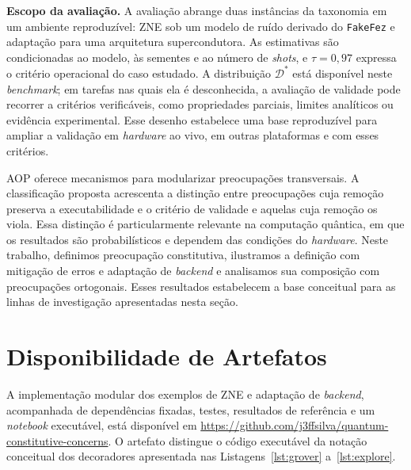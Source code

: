 \documentclass[sigconf]{acmart}
\begin{document}
\textbf{Escopo da avaliação.} A avaliação abrange duas instâncias da taxonomia em um ambiente reproduzível: ZNE sob um modelo de ruído derivado do \texttt{FakeFez} e adaptação para uma arquitetura supercondutora. As estimativas são condicionadas ao modelo, às sementes e ao número de \textit{shots}, e $\tau=0{,}97$ expressa o critério operacional do caso estudado. A distribuição $\mathcal{D}^*$ está disponível neste \textit{benchmark}; em tarefas nas quais ela é desconhecida, a avaliação de validade pode recorrer a critérios verificáveis, como propriedades parciais, limites analíticos ou evidência experimental. Esse desenho estabelece uma base reproduzível para ampliar a validação em \textit{hardware} ao vivo, em outras plataformas e com esses critérios.

AOP oferece mecanismos para modularizar preocupações transversais. A classificação proposta acrescenta a distinção entre preocupações cuja remoção preserva a executabilidade e o critério de validade e aquelas cuja remoção os viola. Essa distinção é particularmente relevante na computação quântica, em que os resultados são probabilísticos e dependem das condições do \textit{hardware}. Neste trabalho, definimos preocupação constitutiva, ilustramos a definição com mitigação de erros e adaptação de \textit{backend} e analisamos sua composição com preocupações ortogonais. Esses resultados estabelecem a base conceitual para as linhas de investigação apresentadas nesta seção.

\section*{Disponibilidade de Artefatos}
A implementação modular dos exemplos de ZNE e adaptação de \textit{backend}, acompanhada de dependências fixadas, testes, resultados de referência e um \textit{notebook} executável, está disponível em \url{https://github.com/j3ffsilva/quantum-constitutive-concerns}. O artefato distingue o código executável da notação conceitual dos decoradores apresentada nas Listagens~\ref{lst:grover} a~\ref{lst:explore}.



\end{document}
